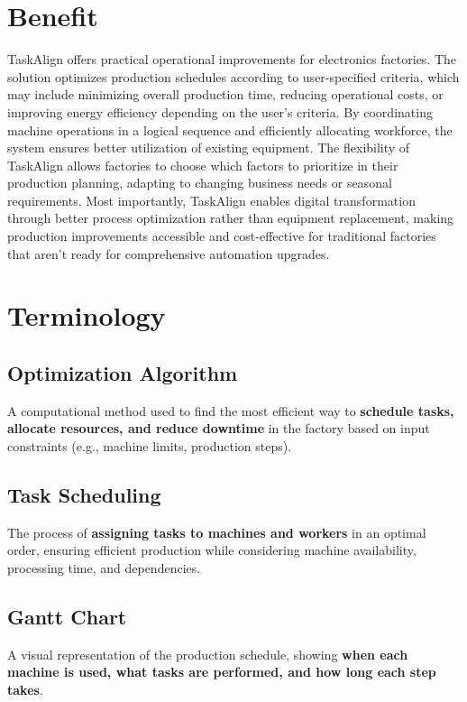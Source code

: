 \section{Benefit}
\label{section:benefit}

TaskAlign offers practical operational improvements for electronics factories. The solution optimizes production schedules according to user-specified criteria, which may include minimizing overall production time, reducing operational costs, or improving energy efficiency depending on the user's criteria. By coordinating machine operations in a logical sequence and efficiently allocating workforce, the system ensures better utilization of existing equipment.
The flexibility of TaskAlign allows factories to choose which factors to prioritize in their production planning, adapting to changing business needs or seasonal requirements. 
Most importantly, TaskAlign enables digital transformation through better process optimization rather than equipment replacement, making production improvements accessible and cost-effective for traditional factories that aren't ready for comprehensive automation upgrades.

\section{Terminology}
\label{section:terminology}

\subsection{Optimization Algorithm}
A computational method used to find the most efficient way to \textbf{schedule tasks, allocate resources, and reduce downtime} in the factory based on input constraints (e.g., machine limits, production steps).  

\subsection{Task Scheduling}
The process of \textbf{assigning tasks to machines and workers} in an optimal order, ensuring efficient production while considering machine availability, processing time, and dependencies.

\subsection{Gantt Chart}
A visual representation of the production schedule, showing \textbf{when each machine is used, what tasks are performed, and how long each step takes}.


